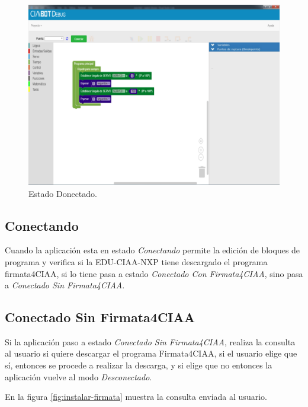 \begin{figure}[!htbp]
	\begin{center}  %
		\includegraphics[width=15cm]{./Figures/debug-inicio.png}
		\par\caption{Estado Donectado.}\label{fig:desconectado}
	\end{center}
\end{figure}


\subsection{Conectando}
\label{subsec:Conectando}

Cuando la aplicación esta en estado \emph{Conectando} permite la edición de bloques de programa y verifica si la EDU-CIAA-NXP tiene descargado el programa firmata4CIAA, si lo tiene pasa a estado \emph{Conectado Con Firmata4CIAA}, sino pasa a \emph{Conectado Sin Firmata4CIAA}.

\subsection{Conectado Sin Firmata4CIAA}
\label{subsec:Conectado Sin Firmata4CIAA}

Si la aplicación paso a estado \emph{Conectado Sin Firmata4CIAA}, realiza la consulta al usuario si quiere descargar el programa Firmata4CIAA, si el usuario elige que sí, entonces se procede a realizar la descarga, y si elige que no entonces la aplicación vuelve al modo \emph{Desconectado}.

En la figura \ref{fig:instalar-firmata} muestra la consulta enviada al usuario.

